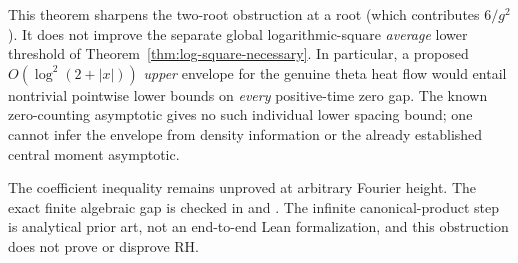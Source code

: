 This theorem sharpens the two-root obstruction
at a root (which contributes $6/g^2$).
It does not improve the separate
global logarithmic-square \emph{average}
lower threshold of Theorem~\ref{thm:log-square-necessary}.
In particular, a proposed
$O(\log^2(2+|x|))$ \emph{upper} envelope for
the genuine theta heat flow would entail
nontrivial pointwise lower bounds on
\emph{every} positive-time zero gap.
The known zero-counting asymptotic gives
no such individual lower spacing bound;
one cannot infer the envelope from
density information or the already
established central moment asymptotic.

The coefficient inequality remains
unproved at arbitrary Fourier height.
The exact finite algebraic gap is checked in
 and
.
The infinite canonical-product step is
analytical prior art, not an end-to-end
Lean formalization, and this obstruction
does not prove or disprove RH.
